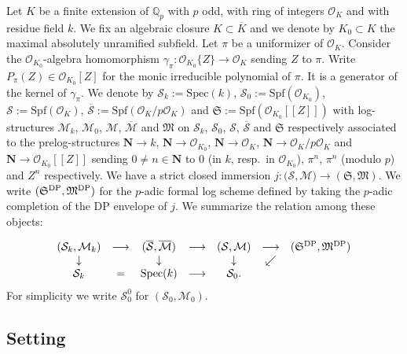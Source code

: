 \documentclass[asterisque,english]{smfart}
\newcommand{\N}{\mathbf{N}}
\begin{document}
Let $K$ be a finite extension of $\mathbb{Q}_p$ with $p$ odd, with ring of integers $\mathcal{O}_K$  and with  residue field $k$. We fix an algebraic closure $K\subset \overline{K}$ and we denote by $K_0\subset K$ the maximal absolutely unramified subfield. Let $\pi$ be a uniformizer of $\mathcal{O}_K$. Consider  the $\mathcal{O}_{K_0}$-algebra homomorphism $\gamma_\pi\colon \mathcal{O}_{K_0}\{Z\}\to \mathcal{O}_{K}$ sending $Z$ to $\pi$. Write
$P_\pi(Z)\in \mathcal{O}_{K_0}[Z]$ for the monic irreducible polynomial of $\pi$. It is a generator of the kernel of $\gamma_\pi$. We denote by $\mathcal{S}_k:=\mathrm{Spec}(k)$, $\mathcal{S}_0:=\mathrm{Spf}(\mathcal{O}_{K_0})$, 
$\mathcal{S}:=\mathrm{Spf}(\mathcal{O}_{K})$, $\overline{\mathcal{S}}:=\mathrm{Spf}(\mathcal{O}_{K}/p \mathcal{O}_K)$ and $\mathfrak{S}:=\mathrm{Spf}(\mathcal{O}_{K_0}[\![Z]\!])$ with log-structures $\mathcal{M}_k$, $\mathcal{M}_0$, $\mathcal{M}$, $\overline{\mathcal{M}}$ and $\mathfrak{M}$ on $\mathcal{S}_k$, $\mathcal{S}_0$, $\mathcal{S}$, $\overline{\mathcal{S}}$ and $\mathfrak{S}$ respectively associated to the prelog-structures $\N\longrightarrow  k$, $\N\longrightarrow \mathcal{O}_{K_0} $, $\N\longrightarrow \mathcal{O}_K $, $\N\longrightarrow \mathcal{O}_K/p \mathcal{O}_K $ and  $\N\longrightarrow \mathcal{O}_{K_0}[\![Z]\!]$ sending $0\neq n\in \N$ to $0$ (in $k$, resp.~in $\mathcal{O}_{K_0}$), $\pi^n$, $\pi^n$ (modulo $p$) and  $Z^n$ respectively. We have a strict closed immersion $j\colon \bigl(\mathcal{S},\mathcal{M}\bigr)\to (\mathfrak{S},\mathfrak{M})$. We write  $(\mathfrak{S}^{\rm DP},\mathfrak{M}^{\mathrm{DP}})$ for the $p$-adic formal log scheme defined by taking the $p$-adic completion of the DP envelope of $j$. We summarize the relation among these objects:

$$
\begin{array}{cccccccccccc}
(\mathcal{S}_k,\mathcal{M}_k) & \longrightarrow  &(\overline{\mathcal{S}},\overline{\mathcal{M}}) & \longrightarrow &   (\mathcal{S},\mathcal{M}) & \longrightarrow &  (\mathfrak{S}^{\rm DP},\mathfrak{M}^{\mathrm{DP}})\\
\downarrow & & \downarrow&& \downarrow & \swarrow \\
\mathcal{S}_k & = & \mathrm{Spec}(k) &\longrightarrow& \mathcal{S}_0 .
\end{array}
$$For simplicity we write  $\mathcal{S}_0^0$  for $(\mathcal{S}_0,\mathcal{M}_0)$.




\subsection{Setting}\label{sec:setting}
\end{document}
